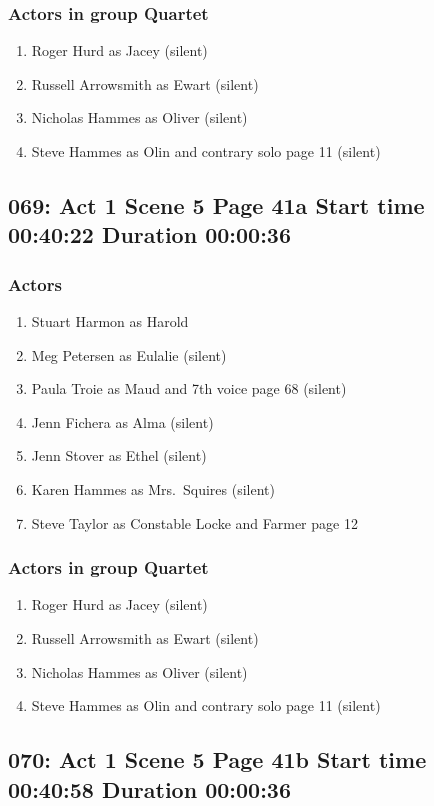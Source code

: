 \subsubsection{Actors in group Quartet}
\begin{enumerate}
\item Roger Hurd as Jacey (silent)
\item Russell Arrowsmith as Ewart (silent)
\item Nicholas Hammes as Oliver (silent)
\item Steve Hammes as Olin and contrary solo page 11 (silent)
\end{enumerate}


\subsection{069: Act 1 Scene 5 Page 41a Start time 00:40:22 Duration 00:00:36}

\subsubsection{Actors}
\begin{enumerate}
\item Stuart Harmon as Harold
\item Meg Petersen as Eulalie (silent)
\item Paula Troie as Maud and 7th voice page 68 (silent)
\item Jenn Fichera as Alma (silent)
\item Jenn Stover as Ethel (silent)
\item Karen Hammes as Mrs.~Squires (silent)
\item Steve Taylor as Constable Locke and Farmer page 12
\end{enumerate}
\subsubsection{Actors in group Quartet}
\begin{enumerate}
\item Roger Hurd as Jacey (silent)
\item Russell Arrowsmith as Ewart (silent)
\item Nicholas Hammes as Oliver (silent)
\item Steve Hammes as Olin and contrary solo page 11 (silent)
\end{enumerate}


\subsection{070: Act 1 Scene 5 Page 41b Start time 00:40:58 Duration 00:00:36}


